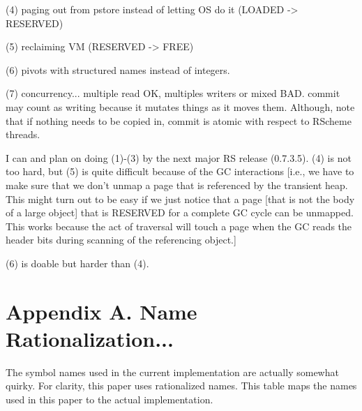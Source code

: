 \documentclass[10pt,letterpaper]{article}
\begin{document}
(4) paging out from pstore instead of letting OS do it (LOADED -> RESERVED)

(5) reclaiming VM (RESERVED -> FREE)

(6) pivots with structured names instead of integers.

(7) concurrency... multiple read OK, multiples writers or mixed BAD.  commit
    may count as writing because it mutates things as it moves them.  Although,
    note that if nothing needs to be copied in, commit is atomic with respect
    to RScheme threads.


I can and plan on doing (1)-(3) by the next major RS release
(0.7.3.5).  (4) is not too hard, but (5) is quite difficult because of
the GC interactions [i.e., we have to make sure that we don't unmap a
page that is referenced by the transient heap.  This might turn out to
be easy if we just notice that a page [that is not the body of a large
object] that is RESERVED for a complete GC cycle can be unmapped.
This works because the act of traversal will touch a page when the GC
reads the header bits during scanning of the referencing object.]

(6) is doable but harder than (4).



\section{Appendix A.  Name Rationalization...}

The symbol names used in the current implementation are actually
somewhat quirky.  For clarity, this paper uses rationalized names.
This table maps the names used in this paper to the actual
implementation.
\end{document}
